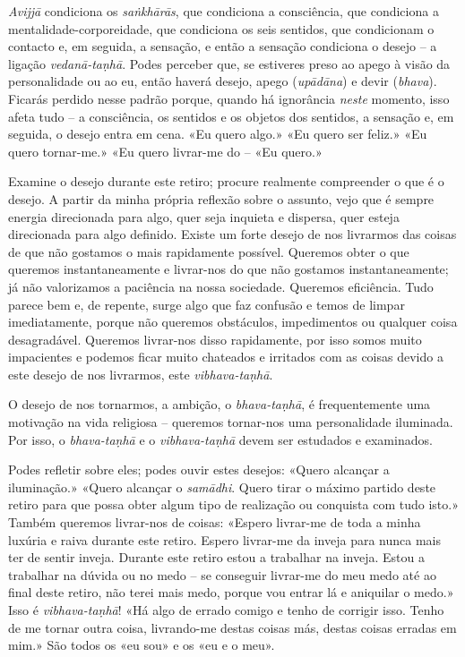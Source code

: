 \emph{Avijjā} condiciona os \emph{saṅkhārās}, que condiciona a consciência, que
condiciona a mentalidade-corporeidade, que condiciona os seis sentidos, que
condicionam o contacto e, em seguida, a sensação, e então a sensação condiciona
o desejo -- a ligação \emph{vedanā-taṇhā}. Podes perceber que, se estiveres
preso ao apego à visão da personalidade ou ao eu, então haverá desejo, apego
(\emph{upādāna}) e devir (\emph{bhava}). Ficarás perdido nesse padrão porque,
quando há ignorância \emph{neste} momento, isso afeta tudo -- a consciência, os
sentidos e os objetos dos sentidos, a sensação e, em seguida, o desejo entra em
cena. «Eu quero algo.» «Eu quero ser feliz.» «Eu quero tornar-me.» «Eu quero
livrar-me do -- «Eu quero.»

Examine o desejo durante este retiro; procure realmente compreender o que é o
desejo. A partir da minha própria reflexão sobre o assunto, vejo que é sempre
energia direcionada para algo, quer seja inquieta e dispersa, quer esteja
direcionada para algo definido. Existe um forte desejo de nos livrarmos das
coisas de que não gostamos o mais rapidamente possível. Queremos obter o que
queremos instantaneamente e livrar-nos do que não gostamos instantaneamente; já
não valorizamos a paciência na nossa sociedade. Queremos eficiência. Tudo parece
bem e, de repente, surge algo que faz confusão e temos de limpar imediatamente,
porque não queremos obstáculos, impedimentos ou qualquer coisa desagradável.
Queremos livrar-nos disso rapidamente, por isso somos muito impacientes e
podemos ficar muito chateados e irritados com as coisas devido a este desejo de
nos livrarmos, este \emph{vibhava-taṇhā}.

O desejo de nos tornarmos, a ambição, o \emph{bhava-taṇhā}, é frequentemente
uma motivação na vida religiosa -- queremos tornar-nos uma personalidade
iluminada. Por isso, o \emph{bhava-taṇhā} e o \emph{vibhava-taṇhā} devem ser
estudados e examinados.

Podes refletir sobre eles; podes ouvir estes desejos: «Quero alcançar a
iluminação.» «Quero alcançar o \emph{samādhi}. Quero tirar o máximo partido deste
retiro para que possa obter algum tipo de realização ou conquista com tudo
isto.» Também queremos livrar-nos de coisas: «Espero livrar-me de toda a minha
luxúria e raiva durante este retiro. Espero livrar-me da inveja para nunca mais
ter de sentir inveja. Durante este retiro estou a trabalhar na inveja. Estou a
trabalhar na dúvida ou no medo -- se conseguir livrar-me do meu medo até ao
final deste retiro, não terei mais medo, porque vou entrar lá e aniquilar o
medo.» Isso é \emph{vibhava-taṇhā}! «Há algo de errado comigo e tenho de
corrigir isso. Tenho de me tornar outra coisa, livrando-me destas coisas más,
destas coisas erradas em mim.» São todos os «eu sou» e os «eu e o meu».

